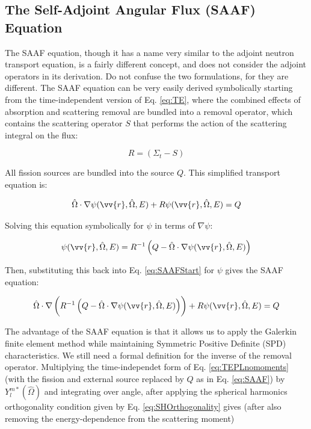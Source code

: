 \documentclass[10pt]{article}
\begin{document}
\begin{flushleft}
\section{The Self-Adjoint Angular Flux (SAAF) Equation}

The SAAF equation, though it has a name very similar to the adjoint neutron transport equation, is a fairly different concept, and does not consider the adjoint operators in its derivation. Do not confuse the two formulations, for they are different. The SAAF equation can be very easily derived symbolically starting from the time-independent version of Eq. \ref{eq:TE}, where the combined effects of absorption and scattering removal are bundled into a removal operator, which contains the scattering operator \(S\) that performs the action of the scattering integral on the flux:

\begin{equation}
\label{eq:SAAFRemovalOperator}
R = (\Sigma_t - S)
\end{equation}

All fission sources are bundled into the source \(Q\). This simplified transport equation is:

\begin{equation}
\label{eq:SAAFStart}
\hat{\Omega}\cdot\nabla\psi(\vv{r}, \hat{\Omega}, E) + R\psi(\vv{r}, \hat{\Omega}, E) = Q
\end{equation}

Solving this equation symbolically for \(\psi\) in terms of \(\nabla\psi\):

\begin{equation}
\label{eq:SAAFStep1}
\psi(\vv{r}, \hat{\Omega}, E) = R^{-1}\left(Q-\hat{\Omega}\cdot\nabla\psi(\vv{r}, \hat{\Omega}, E)\right)
\end{equation}

Then, substituting this back into Eq. \ref{eq:SAAFStart} for \(\psi\) gives the SAAF equation:

\begin{equation}
\label{eq:SAAF}
\hat{\Omega} \cdot \nabla \left( R^{-1}\left(Q-\hat{\Omega}\cdot\nabla\psi(\vv{r}, \hat{\Omega}, E)\right)\right) + R\psi(\vv{r}, \hat{\Omega}, E) = Q
\end{equation}

The advantage of the SAAF equation is that it allows us to apply the Galerkin finite element method while maintaining Symmetric Positive Definite (SPD) characteristics. We still need a formal definition for the inverse of the removal operator. Multiplying the time-independet form of Eq. \ref{eq:TEPLnomoments} (with the fission and external source replaced by \(Q\) as in Eq. \ref{eq:SAAF}) by \(Y_l^{m*}(\hat{\Omega})\) and integrating over angle, after applying the spherical harmonics orthogonality condition given by Eq. \ref{eq:SHOrthogonality} gives (after also removing the energy-dependence from the scattering moment)


\end{flushleft}
\end{document}
